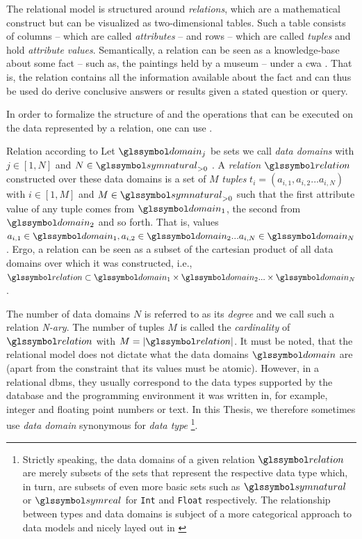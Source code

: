 The relational model is structured around \emph{relations}, which are a mathematical construct but can be visualized as two-dimensional tables. Such a table consists of columns -- which are called \emph{attributes} -- and rows -- which are called \emph{tuples} and hold \emph{attribute values}. Semantically, a relation can be seen as a knowledge-base about some fact -- such as, the paintings held by a museum -- under a \acrfull{cwa} \cite{Reiter:1981Closed}. That is, the relation contains all the information available about the fact and can thus be used do derive conclusive answers or results given a stated question or query.

In order to formalize the structure of and the operations that can be executed on the data represented by a relation, one can use . 

\begin{definition}[label=definition:relation]{Relation according to \cite{Codd:1970Relational}}{}
    Let $\domain_j$ be sets we call \emph{data domains} with $j \in \left[ 1, N \right]$ and $N \in \symnatural_{> 0}$ . A \emph{relation} $\relation$ constructed over these data domains is a set of $M$ \emph{tuples} $t_i = (a_{i,1}, a_{i,2} ... a_{i,N})$ with $i \in \left[ 1, M \right]$ and $M \in \symnatural_{> 0}$ such that the first attribute value of any tuple comes from $\domain_1$, the second from $\domain_2$ and so forth. That is, values $a_{i,1} \in \domain_1, a_{i,2} \in \domain_2 ... a_{i,N} \in \domain_N$. Ergo, a relation can be seen as a subset of the cartesian product of all data domains over which it was constructed, i.e., $\relation \subset \domain_1 \times \domain_2 ... \times \domain_N$.
\end{definition}

The number of data domains $N$ is referred to as its \emph{degree} and we call such a relation \emph{N-ary}. The number of tuples $M$ is called the \emph{cardinality} of $\relation$ with $M = |\relation|$. It must be noted, that the relational model does not dictate what the data domains $\domain$ are (apart from the constraint that its values must be atomic). However, in a relational \acrshort{dbms}, they usually correspond to the data types supported by the database and the programming environment it was written in, for example, integer and floating point numbers or text. In this Thesis, we therefore sometimes use \emph{data domain} synonymous for \emph{data type} \footnote{Strictly speaking, the data domains of a given relation $\relation$ are merely subsets of the sets that represent the respective data type which, in turn, are subsets of even more basic sets such as $\symnatural$ or $\symreal$ for \lstinline{Int} and \lstinline{Float} respectively. The relationship between types and data domains is subject of a more categorical approach to data models and nicely layed out in \cite{Spivak:2009Simplicial}}.

